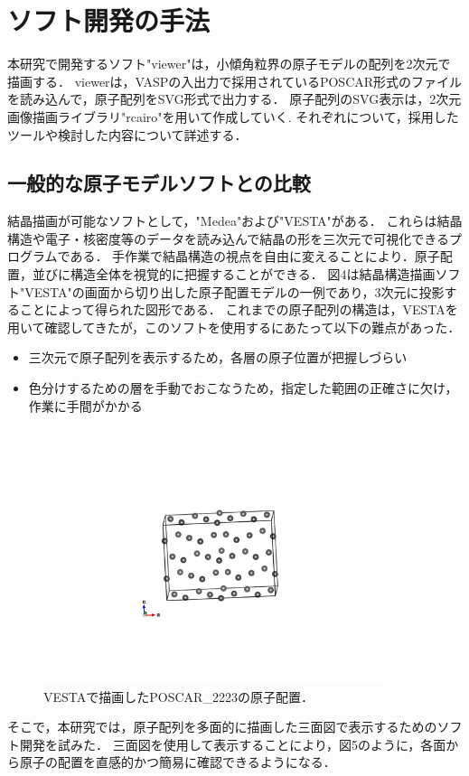 
\section{ソフト開発の手法}
本研究で開発するソフト"viewer"は，小傾角粒界の原子モデルの配列を2次元で描画する．
viewerは，VASPの入出力で採用されているPOSCAR形式のファイルを読み込んで，原子配列をSVG形式で出力する．
原子配列のSVG表示は，2次元画像描画ライブラリ"rcairo"を用いて作成していく.
それぞれについて，採用したツールや検討した内容について詳述する．

\subsection{一般的な原子モデルソフトとの比較}
結晶描画が可能なソフトとして，"Medea"および"VESTA"がある．
これらは結晶構造や電子・核密度等のデータを読み込んで結晶の形を三次元で可視化できるプログラムである\cite{vesta}．
手作業で結晶構造の視点を自由に変えることにより．原子配置，並びに構造全体を視覚的に把握することができる．
図4は結晶構造描画ソフト"VESTA"の画面から切り出した原子配置モデルの一例であり，3次元に投影することによって得られた図形である．
これまでの原子配列の構造は，VESTAを用いて確認してきたが，このソフトを使用するにあたって以下の難点があった．

\begin{itemize}
\item 三次元で原子配列を表示するため，各層の原子位置が把握しづらい
\item 色分けするための層を手動でおこなうため，指定した範囲の正確さに欠け，作業に手間がかかる
\end{itemize}
\begin{figure}[htbp]\begin{center}
\includegraphics[width=10cm,bb= 0 0 737 553]{../figs/./boundary_narita.006.jpeg}
\caption{VESTAで描画したPOSCAR\_2223の原子配置．}
\label{default}\end{center}\end{figure}
そこで，本研究では，原子配列を多面的に描画した三面図で表示するためのソフト開発を試みた．
三面図を使用して表示することにより，図5のように，各面から原子の配置を直感的かつ簡易に確認できるようになる．

